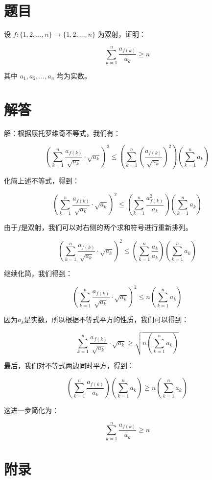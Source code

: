 \documentclass[UTF8]{ctexart}
\begin{document}
\section{题目}
设 $f:\{1,2,\dots,n\} \rightarrow \{1,2,\dots,n\}$ 为双射，证明：

\[
    \sum_{k=1}^{n} \frac{a_{f(k)}}{a_k} \geq n
\]

其中 $a_1, a_2, \dots, a_n$ 均为实数。

\section{解答}
解：根据康托罗维奇不等式，我们有：

\[
    \left( \sum_{k=1}^{n} \frac{a_{f(k)}}{\sqrt{a_k}} \cdot \sqrt{a_k} \right)^2 \leq \left( \sum_{k=1}^{n} \left( \frac{a_{f(k)}}{\sqrt{a_k}} \right)^2 \right) \left( \sum_{k=1}^{n} a_k \right)
\]

化简上述不等式，得到：

\[
    \left( \sum_{k=1}^{n} \frac{a_{f(k)}}{\sqrt{a_k}} \cdot \sqrt{a_k} \right)^2 \leq \left( \sum_{k=1}^{n} \frac{a_{f(k)}^2}{a_k} \right) \left( \sum_{k=1}^{n} a_k \right)
\]

由于$f$是双射，我们可以对右侧的两个求和符号进行重新排列。

\[
    \left( \sum_{k=1}^{n} \frac{a_{f(k)}}{\sqrt{a_k}} \cdot \sqrt{a_k} \right)^2 \leq \left( \sum_{k=1}^{n} \frac{a_{k}}{a_k} \right) \left( \sum_{k=1}^{n} a_k \right)
\]

继续化简，我们得到：

\[
    \left( \sum_{k=1}^{n} \frac{a_{f(k)}}{\sqrt{a_k}} \cdot \sqrt{a_k} \right)^2 \leq n \left( \sum_{k=1}^{n} a_k \right)
\]

因为$a_k$是实数，所以根据不等式平方的性质，我们可以得到：

\[
    \sum_{k=1}^{n} \frac{a_{f(k)}}{\sqrt{a_k}} \cdot \sqrt{a_k} \geq \sqrt{n \left( \sum_{k=1}^{n} a_k \right)}
\]

最后，我们对不等式两边同时平方，得到：

\[
    \left( \sum_{k=1}^{n} \frac{a_{f(k)}}{a_k} \right) \left( \sum_{k=1}^{n} a_k \right) \geq n \left( \sum_{k=1}^{n} a_k \right)
\]

这进一步简化为：

\[
    \sum_{k=1}^{n} \frac{a_{f(k)}}{a_k} \geq n
\]

\section*{附录}
\end{document}
